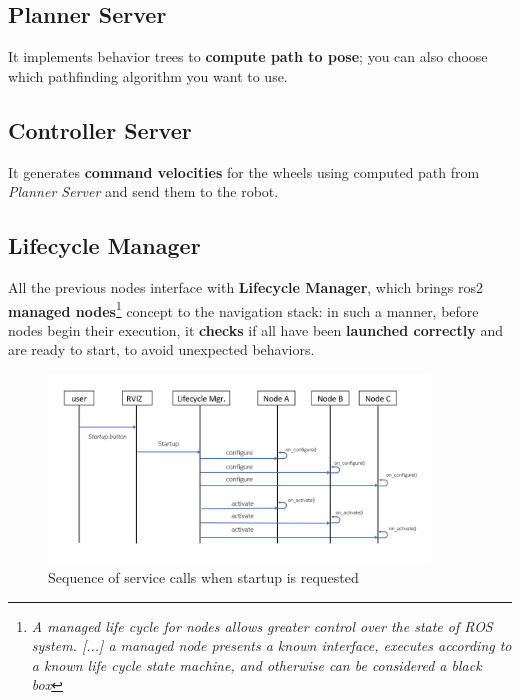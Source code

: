 \subsection{Planner Server}

It implements behavior trees to \textbf{compute path to pose}; you can also choose which pathfinding algorithm you want to use.

\subsection{Controller Server}

It generates \textbf{command velocities} for the wheels using computed path from \textit{Planner Server} and send them to the robot.



\subsection{Lifecycle Manager}

All the previous nodes interface with \textbf{Lifecycle Manager}, which brings \acrshort{ros}2 \textbf{managed nodes}\footnote{\textit{A managed life cycle for nodes allows greater control over the state of ROS system. [...] a managed node presents a known interface, executes according to a known life cycle state machine, and otherwise can be considered a black box}\cite{lifecycle}} concept to the navigation stack: in such a manner, before nodes begin their execution, it \textbf{checks} if all have been \textbf{launched correctly} and are ready to start, to avoid unexpected behaviors.

\begin{figure}[h]
    \centering
    \includegraphics[width=0.9\textwidth]{images/uml_lifecycle_manager}
    \caption{Sequence of service calls when startup is requested}
\end{figure}

